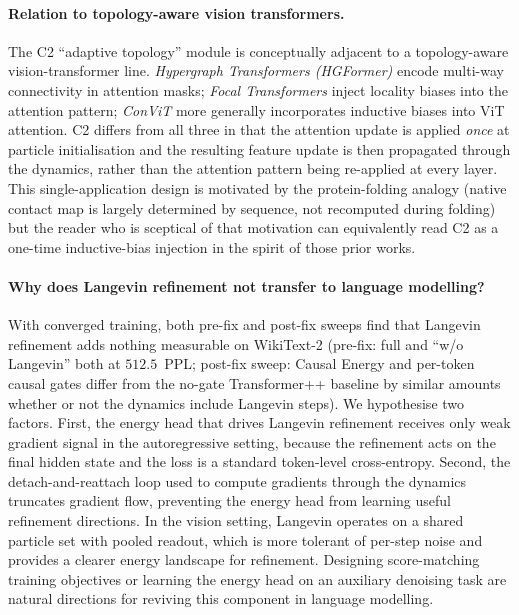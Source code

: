 \documentclass[fleqn,10pt]{article}
\begin{document}
\paragraph{Relation to topology-aware vision transformers.}
The C2 ``adaptive topology'' module is conceptually adjacent to a
topology-aware vision-transformer line.
\emph{Hypergraph Transformers (HGFormer)}\cite{hgformer2022} encode
multi-way connectivity in attention masks; \emph{Focal
Transformers}\cite{focal2021} inject locality biases into the
attention pattern; \emph{ConViT}\cite{dascoli2021convit} more generally
incorporates inductive biases into ViT attention. C2 differs from
all three in that the attention update is applied \emph{once} at
particle initialisation and the resulting feature update is then
propagated through the dynamics, rather than the attention pattern
being re-applied at every layer. This single-application design is
motivated by the protein-folding analogy (native contact map is
largely determined by sequence, not recomputed during folding) but
the reader who is sceptical of that motivation can equivalently
read C2 as a one-time inductive-bias injection in the spirit of
those prior works.

\paragraph{Why does Langevin refinement not transfer to language modelling?}
With converged training, both pre-fix and post-fix sweeps find
that Langevin refinement adds nothing measurable on WikiText-2
(pre-fix: full and ``w/o Langevin'' both at $512.5$~PPL; post-fix
sweep: Causal Energy and per-token causal gates differ from the
no-gate Transformer++ baseline by similar amounts whether or not
the dynamics include Langevin steps). We
hypothesise two factors. First, the energy head that drives Langevin
refinement receives only weak gradient signal in the autoregressive
setting, because the refinement acts on the final hidden state and
the loss is a standard token-level cross-entropy. Second, the
detach-and-reattach loop used to compute gradients through the
dynamics truncates gradient flow, preventing the energy head from
learning useful refinement directions. In the vision setting,
Langevin operates on a shared particle set with pooled readout,
which is more tolerant of per-step noise and provides a clearer
energy landscape for refinement. Designing score-matching training
objectives\cite{song2019generative} or learning the energy head on
an auxiliary denoising task are natural directions for reviving this
component in language modelling.
\end{document}
